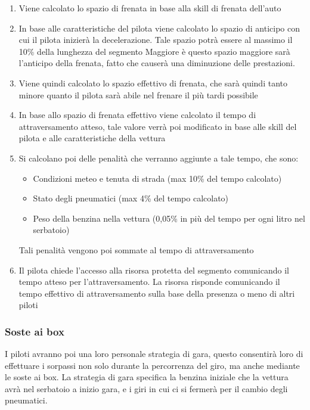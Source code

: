 \documentclass[a4paper,11pt, twoside, openright]{book}
\begin{document}
	  \begin{enumerate}
	    \item Viene calcolato lo spazio di frenata in base alla skill di frenata dell'auto
	    \item In base alle caratteristiche del pilota viene calcolato lo spazio di anticipo con cui il
		  pilota inizierà la decelerazione. Tale spazio potrà essere al massimo il 10\% della lunghezza del segmento
		  Maggiore è questo spazio maggiore sarà l'anticipo della frenata, fatto che causerà una diminuzione delle prestazioni.
	    \item Viene quindi calcolato lo spazio effettivo di frenata, che sarà quindi tanto minore quanto
		  il pilota sarà abile nel frenare il più tardi possibile
	    \item In base allo spazio di frenata effettivo viene calcolato il tempo di attraversamento atteso, tale valore
	          verrà poi modificato in base alle skill del pilota e alle caratteristiche della vettura
	    \item Si calcolano poi delle penalità che verranno aggiunte a tale tempo, che sono:
		  \begin{itemize}
		    \item Condizioni meteo e tenuta di strada (max 10\% del tempo calcolato)
		    \item Stato degli pneumatici (max 4\% del tempo calcolato)
		    \item Peso della benzina nella vettura (0,05\% in più del tempo per ogni litro nel serbatoio)
		  \end{itemize}
		  Tali penalità vengono poi sommate al tempo di attraversamento
	    \item Il pilota chiede l'accesso alla risorsa protetta del segmento
		  comunicando il tempo atteso per l'attraversamento. La risorsa risponde comunicando il tempo
		  effettivo di attraversamento sulla base della presenza o meno di altri piloti
	  \end{enumerate}
	  
	  

	\subsubsection{Soste ai box}
	  I piloti avranno poi una loro personale strategia di gara, questo consentirà loro di effettuare
	  i sorpassi non solo durante la percorrenza del giro, ma anche mediante le soste ai box.
	  La strategia di gara specifica la benzina iniziale che la vettura avrà nel serbatoio a inizio gara,
	  e i giri in cui ci si fermerà per il cambio degli pneumatici.
	  
\end{document}
